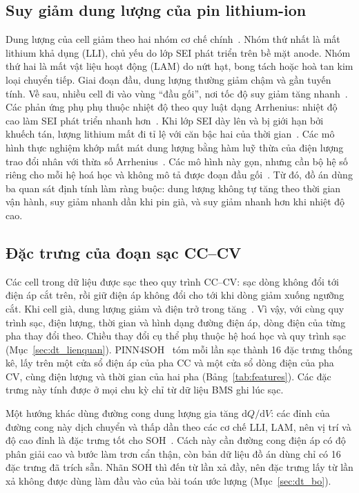 \subsection{Suy giảm dung lượng của pin lithium-ion}

Dung lượng của cell giảm theo hai nhóm cơ chế chính~\cite{birkl2017}. Nhóm thứ nhất là mất lithium khả dụng (LLI), chủ
yếu do lớp SEI phát triển trên bề mặt anode. Nhóm thứ hai là mất vật liệu hoạt động (LAM) do nứt hạt, bong tách hoặc hoà
tan kim loại chuyển tiếp. Giai đoạn đầu, dung lượng thường giảm chậm và gần tuyến tính. Về sau, nhiều cell đi vào vùng
``đầu gối'', nơi tốc độ suy giảm tăng nhanh~\cite{attia2022knee}. Các phản ứng phụ phụ thuộc nhiệt độ theo quy luật dạng
Arrhenius: nhiệt độ cao làm SEI phát triển nhanh hơn~\cite{waldmann2014}. Khi lớp SEI dày lên và bị giới hạn bởi khuếch
tán, lượng lithium mất đi tỉ lệ với căn bậc hai của thời gian~\cite{broussely2001,pinson2013}. Các mô hình thực nghiệm
khớp mất mát dung lượng bằng hàm luỹ thừa của điện lượng trao đổi nhân với thừa số
Arrhenius~\cite{wang2011lfp,schmalstieg2014}. Các mô hình này gọn, nhưng cần bộ hệ số riêng cho mỗi hệ hoá học và không
mô tả được đoạn đầu gối~\cite{fermin2020}. Từ đó, đồ án dùng ba quan sát định tính làm ràng buộc: dung lượng không tự
tăng theo thời gian vận hành, suy giảm nhanh dần khi pin già, và suy giảm nhanh hơn khi nhiệt độ cao.

\subsection{Đặc trưng của đoạn sạc CC--CV}\label{sec:lt_dactrung}

Các cell trong dữ liệu được sạc theo quy trình CC--CV: sạc dòng không đổi tới điện áp cắt trên, rồi giữ điện áp không
đổi cho tới khi dòng giảm xuống ngưỡng cắt. Khi cell già, dung lượng giảm và điện trở trong tăng~\cite{birkl2017}. Vì
vậy, với cùng quy trình sạc, điện lượng, thời gian và hình dạng đường điện áp, dòng điện của từng pha thay đổi theo.
Chiều thay đổi cụ thể phụ thuộc hệ hoá học và quy trình sạc (Mục~\ref{sec:dt_lienquan}). PINN4SOH~\cite{wang2024} tóm
mỗi lần sạc thành 16 đặc trưng thống kê, lấy trên một cửa sổ điện áp của pha CC và một cửa sổ dòng điện của pha CV, cùng
điện lượng và thời gian của hai pha (Bảng~\ref{tab:features}). Các đặc trưng này tính được ở mọi chu kỳ chỉ từ dữ liệu BMS
ghi lúc sạc.

Một hướng khác dùng đường cong dung lượng gia tăng $\mathrm{d}Q/\mathrm{d}V$: các đỉnh của đường cong này dịch chuyển và
thấp dần theo các cơ chế LLI, LAM, nên vị trí và độ cao đỉnh là đặc trưng tốt cho SOH~\cite{dubarry2012,weng2013}. Cách
này cần đường cong điện áp có độ phân giải cao và bước làm trơn cẩn thận, còn bản dữ liệu đồ án dùng chỉ có 16 đặc trưng
đã trích sẵn. Nhãn SOH thì đến từ lần xả đầy, nên đặc trưng lấy từ lần xả không được dùng làm đầu vào của bài toán ước
lượng (Mục~\ref{sec:dt_bo}).


